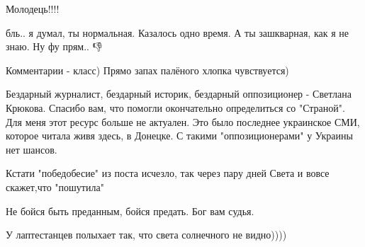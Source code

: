 \begin{itemize}
Молодець!!!!

 
бль.. я думал, ты нормальная. Казалось одно время. А ты зашкварная, как я не знаю. Ну фу прям.. 👎

 
Комментарии - класс) Прямо запах палёного хлопка чувствуется)

 
Бездарный журналист, бездарный историк, бездарный оппозиционер - Светлана Крюкова. Спасибо вам, что помогли окончательно определиться со "Страной". Для меня этот ресурс больше не актуален. Это было последнее украинское СМИ, которое читала живя здесь, в Донецке. С такими "оппозиционерами" у Украины нет шансов.

 
Кстати "победобесие" из поста исчезло, так через пару дней Света и вовсе скажет,что "пошутила"

 
Не бойся быть преданным, бойся предать. Бог вам судья.

 
У лаптестанцев полыхает так, что света солнечного не видно))))


\end{itemize}
